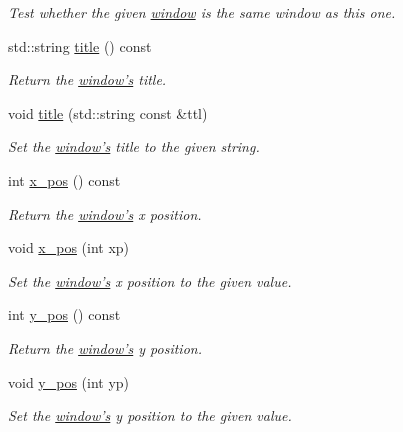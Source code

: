 \begin{DoxyCompactItemize}
\begin{DoxyCompactList}\small\item\em Test whether the given \hyperlink{classgfx_1_1window}{window} is the same window as this one. \end{DoxyCompactList}\item 
std\-::string \hyperlink{classgfx_1_1window_a0a1e663bd73e821033e887264b95a725}{title} () const 
\begin{DoxyCompactList}\small\item\em Return the \hyperlink{classgfx_1_1window}{window's} title. \end{DoxyCompactList}\item 
void \hyperlink{classgfx_1_1window_a9d287c763f53db3d04e9a5213707f8eb}{title} (std\-::string const \&ttl)
\begin{DoxyCompactList}\small\item\em Set the \hyperlink{classgfx_1_1window}{window's} title to the given string. \end{DoxyCompactList}\item 
int \hyperlink{classgfx_1_1window_a66867684bf24fcb3621327702e0840d2}{x\-\_\-pos} () const 
\begin{DoxyCompactList}\small\item\em Return the \hyperlink{classgfx_1_1window}{window's} x position. \end{DoxyCompactList}\item 
void \hyperlink{classgfx_1_1window_abc8bba1c74d722f4ed412491fb322866}{x\-\_\-pos} (int xp)
\begin{DoxyCompactList}\small\item\em Set the \hyperlink{classgfx_1_1window}{window's} x position to the given value. \end{DoxyCompactList}\item 
int \hyperlink{classgfx_1_1window_a95a085937c4469b8a098d975dcaf8ebc}{y\-\_\-pos} () const 
\begin{DoxyCompactList}\small\item\em Return the \hyperlink{classgfx_1_1window}{window's} y position. \end{DoxyCompactList}\item 
void \hyperlink{classgfx_1_1window_a6f0e1d38b8c31f8dc2c58af54258a574}{y\-\_\-pos} (int yp)
\begin{DoxyCompactList}\small\item\em Set the \hyperlink{classgfx_1_1window}{window's} y position to the given value. \end{DoxyCompactList}\item 

\end{DoxyCompactItemize}
